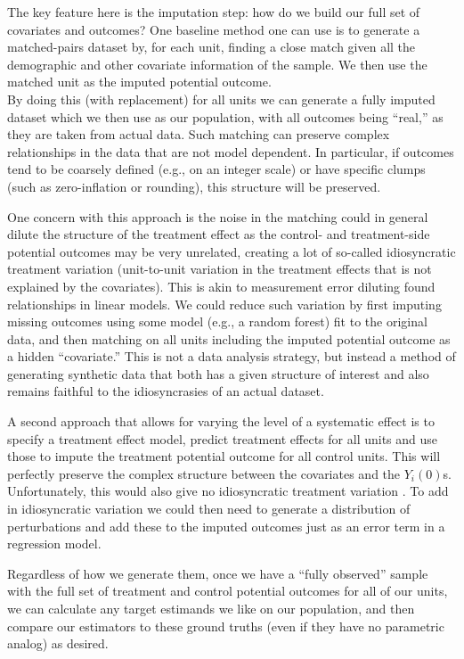\documentclass[
]{book}
\begin{document}
The key feature here is the imputation step: how do we build our full set of covariates and outcomes?
One baseline method one can use is to generate a matched-pairs dataset by, for each unit, finding a close match given all the demographic and other covariate information of the sample. We then use the matched unit as the imputed potential outcome.\\
By doing this (with replacement) for all units we can generate a fully imputed dataset which we then use as our population, with all outcomes being ``real,'' as they are taken from actual data.
Such matching can preserve complex relationships in the data that are not model dependent.
In particular, if outcomes tend to be coarsely defined (e.g., on an integer scale) or have specific clumps (such as zero-inflation or rounding), this structure will be preserved.

One concern with this approach is the noise in the matching could in general dilute the structure of the treatment effect as the control- and treatment-side potential outcomes may be very unrelated, creating a lot of so-called idiosyncratic treatment variation (unit-to-unit variation in the treatment effects that is not explained by the covariates).
This is akin to measurement error diluting found relationships in linear models.
We could reduce such variation by first imputing missing outcomes using some model (e.g., a random forest) fit to the original data, and then matching on all units including the imputed potential outcome as a hidden ``covariate.''
This is not a data analysis strategy, but instead a method of generating synthetic data that both has a given structure of interest and also remains faithful to the idiosyncrasies of an actual dataset.

A second approach that allows for varying the level of a systematic effect is to specify a treatment effect model, predict treatment effects for all units and use those to impute the treatment potential outcome for all control units.
This will perfectly preserve the complex structure between the covariates and the \(Y_i(0)\)s.
Unfortunately, this would also give no idiosyncratic treatment variation .
To add in idiosyncratic variation we could then need to generate a distribution of perturbations and add these to the imputed outcomes just as an error term in a regression model.

Regardless of how we generate them, once we have a ``fully observed'' sample with the full set of treatment and control potential outcomes for all of our units, we can calculate any target estimands we like on our population, and then compare our estimators to these ground truths (even if they have no parametric analog) as desired.
\end{document}
